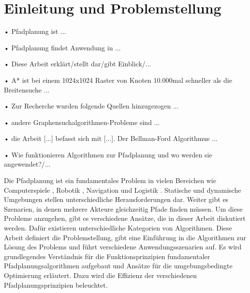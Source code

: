 \chapter{Einleitung und Problemstellung}

• Pfadplanung ist ...

• Pfadplanung findet Anwendung in ...

• Diese Arbeit erklärt/stellt dar/gibt Einblick/...

• A* ist bei einem 1024x1024 Raster von Knoten 10.000mal schneller als die Breitensuche ...

• Zur Recherche wurden folgende Quellen hinzugezogen ...

• andere Graphensuchalgorithmen-Probleme sind ...

• die Arbeit [...] befasst sich mit [...]. Der Bellman-Ford Algorithmus ...

• Wie funktionieren Algorithmen zur Pfadplanung und wo werden sie angewendet?/...



Die Pfadplanung ist ein fundamentales Problem in vielen Bereichen %
wie Computerspiele \cite{Kri09}, Robotik \cite{LB91}, Navigation und Logistik \cite{Botea.2011}. Statische und dynamische Umgebungen stellen unterschiedliche Herausforderungen dar. Weiter gibt es Szenarien, in denen mehrere Akteure gleichzeitig Pfade finden müssen. Um diese Probleme anzugehen, gibt es verschiedene Ansätze, die in dieser Arbeit diskutiert werden. Dafür existieren unterschiedliche Kategorien von Algorithmen. Diese Arbeit definiert die Problemstellung, gibt eine Einführung in die Algorithmen zur Lösung des Problems und führt verschiedene Anwendungsszenarien auf. Es wird grundlegendes Verständnis für die Funktionsprinzipien fundamentaler Pfadplanungsalgorithmen aufgebaut und Ansätze für die umgebungsbedingte Optimierung erläutert. Dazu wird die Effizienz der verschiedenen Pfadplanungsprinzipien beleuchtet.


